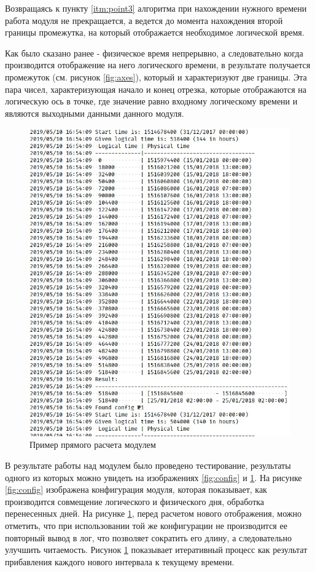 \indent Возвращаясь к пункту \ref{itm:point3} алгоритма при нахождении нужного времени работа модуля не прекращается, а ведется до момента нахождения второй границы промежутка, на который отображается необходимое логической время.

\indent Как было сказано ранее - физическое время непрерывно, а следовательно когда производится отображение на него логического времени, в результате получается промежуток (см. рисунок \ref{fig:axes}), который и характеризуют две границы.
Эта пара чисел, характеризующая начало и конец отрезка, которые отображаются на логическую ось в точке, где значение равно входному логическому времени и являются выходными данными данного модуля.

\begin{figure}[ht!]
	\centering
	\includegraphics[scale=0.6]{pics/scheduleEvalExample.png}
	\caption{Пример прямого расчета модулем}
	\label{fig:eval1}
\end{figure}

\indent В результате работы над модулем было проведено тестирование, результаты одного из которых можно увидеть на изображениях \ref{fig:config} и \ref{fig:eval1}.
На рисунке \ref{fig:config} изображена конфигурация модуля, которая показывает, как производится совмещение логического и физического дня, обработка перенесенных дней.
На рисунке \ref{fig:eval1}, перед расчетом нового отображения, можно отметить, что при использовании той же конфигурации не производится ее повторный вывод в лог, что позволяет сократить его длину, а следовательно улучшить читаемость.
Рисунок \ref{fig:eval1} показывает итеративный процесс как результат прибавления каждого нового интервала к текущему времени.

